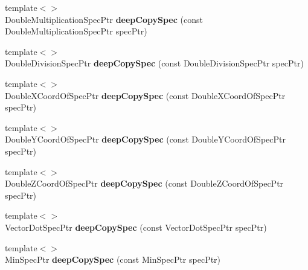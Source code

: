 \begin{DoxyCompactItemize}
\item 
\hypertarget{namespacegiskard__suturo_a4996d34410ca3060b2fc970590eea675}{{\footnotesize template$<$$>$ }\\Double\-Multiplication\-Spec\-Ptr {\bfseries deep\-Copy\-Spec} (const Double\-Multiplication\-Spec\-Ptr spec\-Ptr)}\label{namespacegiskard__suturo_a4996d34410ca3060b2fc970590eea675}

\item 
\hypertarget{namespacegiskard__suturo_ab236dfed4757407ab278ec91c15b0029}{{\footnotesize template$<$$>$ }\\Double\-Division\-Spec\-Ptr {\bfseries deep\-Copy\-Spec} (const Double\-Division\-Spec\-Ptr spec\-Ptr)}\label{namespacegiskard__suturo_ab236dfed4757407ab278ec91c15b0029}

\item 
\hypertarget{namespacegiskard__suturo_ae059f912c2f02c61a66482ef5a49ef23}{{\footnotesize template$<$$>$ }\\Double\-X\-Coord\-Of\-Spec\-Ptr {\bfseries deep\-Copy\-Spec} (const Double\-X\-Coord\-Of\-Spec\-Ptr spec\-Ptr)}\label{namespacegiskard__suturo_ae059f912c2f02c61a66482ef5a49ef23}

\item 
\hypertarget{namespacegiskard__suturo_a7ce8d4c9b912d812b7190e23c4c83fce}{{\footnotesize template$<$$>$ }\\Double\-Y\-Coord\-Of\-Spec\-Ptr {\bfseries deep\-Copy\-Spec} (const Double\-Y\-Coord\-Of\-Spec\-Ptr spec\-Ptr)}\label{namespacegiskard__suturo_a7ce8d4c9b912d812b7190e23c4c83fce}

\item 
\hypertarget{namespacegiskard__suturo_afd36fe02ce35f6b8edd6eeda0a23e422}{{\footnotesize template$<$$>$ }\\Double\-Z\-Coord\-Of\-Spec\-Ptr {\bfseries deep\-Copy\-Spec} (const Double\-Z\-Coord\-Of\-Spec\-Ptr spec\-Ptr)}\label{namespacegiskard__suturo_afd36fe02ce35f6b8edd6eeda0a23e422}

\item 
\hypertarget{namespacegiskard__suturo_a04867bef874702f902b5aae120f89d81}{{\footnotesize template$<$$>$ }\\Vector\-Dot\-Spec\-Ptr {\bfseries deep\-Copy\-Spec} (const Vector\-Dot\-Spec\-Ptr spec\-Ptr)}\label{namespacegiskard__suturo_a04867bef874702f902b5aae120f89d81}

\item 
\hypertarget{namespacegiskard__suturo_a2b66b4a652c59b1292aa66be5810cefe}{{\footnotesize template$<$$>$ }\\Min\-Spec\-Ptr {\bfseries deep\-Copy\-Spec} (const Min\-Spec\-Ptr spec\-Ptr)}\label{namespacegiskard__suturo_a2b66b4a652c59b1292aa66be5810cefe}


\end{DoxyCompactItemize}
